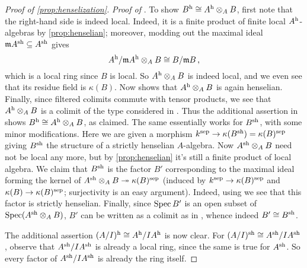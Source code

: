 \begin{proof}[Proof of \cref{prop:henselization}]
	\emph{Proof of }. To show $B^{\mathrm{h}}\cong A^{\mathrm{h}}\otimes_AB$, first note that the right-hand side is indeed local. Indeed, it is a finite product of finite local $A^{\mathrm{h}}$-algebras by \cref{prop:henselian}; moreover, modding out the maximal ideal $\mathfrak{m} A^{\mathrm{sh}}\subseteq A^{\mathrm{sh}}$ gives
	\begin{equation*}
		A^{\mathrm{h}}/\mathfrak{m} A^{\mathrm{h}}\otimes_AB\cong B/\mathfrak{m} B\,,
	\end{equation*}
	which is a local ring since $B$ is local. So $A^{\mathrm{h}}\otimes_AB$ is indeed local, and we even see that its residue field is $\kappa(B)$. Now  shows that $A^{\mathrm{h}}\otimes_AB$ is again henselian. Finally, since filtered colimits commute with tensor products, we see that $A^{\mathrm{h}}\otimes_AB$ is a colimit of the type considered in . Thus the additional assertion in  shows $B^{\mathrm{h}}\cong A^{\mathrm{h}}\otimes_AB$, as claimed. The same essentially works for $B^{\mathrm{sh}}$, with some minor modifications. Here we are given a morphism $k^\sep\morphism\kappa(B^\sh)=\kappa(B)^\sep$ giving $B^{\mathrm{sh}}$ the structure of a strictly henselian $A$-algebra. Now $A^{\mathrm{sh}}\otimes_AB$ need not be local any more, but by \cref{prop:henselian} it's still a finite product of local algebra. We claim that $B^{\mathrm{sh}}$ is the factor $B'$ corresponding to the maximal ideal forming the kernel of $A^\sh\otimes _AB\epimorphism \kappa(B)^\sep$ (induced by $k^\sep\morphism\kappa(B)^\sep$ and $\kappa(B)\morphism \kappa(B)^\sep$; surjectivity is an easy argument). Indeed, using  we see that this factor is strictly henselian. Finally, since $\operatorname{Spec} B'$ is an open subset of $\operatorname{Spec} (A^{\mathrm{sh}}\otimes_AB)$, $B'$ can be written as a colimit as in , whence indeed $B'\cong B^{\mathrm{sh}}$.
	
	The additional assertion $(A/I)^{\mathrm{h}}\cong A^{\mathrm{h}}/IA^{\mathrm{h}}$ is now clear. For $(A/I)^{\mathrm{sh}}\cong A^{\mathrm{sh}}/IA^{\mathrm{sh}}$, observe that $A^{\mathrm{sh}}/IA^{\mathrm{sh}}$ is already a local ring, since the same is true for $A^{\mathrm{sh}}$. So every factor of $A^{\mathrm{sh}}/IA^{\mathrm{sh}}$ is already the ring itself.
	

\end{proof}
